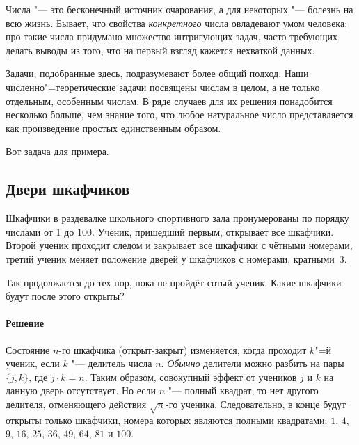 \documentclass[twoside]{book}
\makeatletter
\newcommand{\rindex}[2][\imki@jobname]{%
  \index[#1]{\detokenize{#2}}%
}
\makeatother
\begin{document}

 

Числа "--- это бесконечный источник очарования, а для некоторых "--- болезнь на всю жизнь. %
Бывает, что свойства \emph{конкретного} числа овладевают умом человека;
про такие числа придумано множество интригующих задач,
часто требующих делать выводы из того, что на первый взгляд кажется нехваткой данных.

Задачи, подобранные здесь, подразумевают %
более общий подход. %
Наши численно"=теоретические задачи посвящены числам в целом, а не только отдельным, особенным числам.
В ряде случаев для их решения понадобится несколько больше, чем знание того, 
что любое натуральное число представляется как произведение простых единственным образом.

\medskip

Вот задача для примера.

\subsection*{Двери шкафчиков}%
\rindex{Двери шкафчиков}

Шкафчики в раздевалке школьного спортивного зала пронумерованы по порядку числами от 1 до 100.
Ученик, пришедший первым, открывает все шкафчики.
Второй ученик проходит следом и закрывает все шкафчики с чётными номерами, третий ученик меняет положение дверей у шкафчиков с номерами, кратными~3.

Так продолжается до тех пор, пока не пройдёт сотый ученик.
Какие шкафчики будут после этого открыты?
 
\paragraph{Решение}

Состояние $n$-го шкафчика (открыт-закрыт) изменяется, когда проходит $k$"=й ученик, если $k$ "--- делитель числа $n$.
\emph{Обычно} делители можно разбить на пары $\{j,k\}$, где $j\cdot k=n$.
Таким образом, совокупный эффект от учеников $j$ и $k$ на данную дверь отсутствует. %
Но если $n$ "--- полный квадрат, то нет другого делителя, отменяющего действия $\sqrt{n}$-го ученика.
Следовательно, в конце будут открыты только шкафчики, номера которых являются полными квадратами: $1$, $4$, $9$, $16$, $25$, $36$, $49$, $64$, $81$ и $100$.\heart
 
\end{document}
